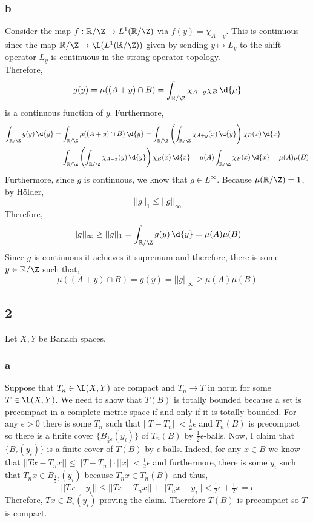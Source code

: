 \documentclass[12pt]{article}
\newcommand{\R}{\mathbb{R}}
\begin{document}
\subsubsection{b}

Consider the map $f : \R / \Z \to L^1(\R / \Z)$ via $f(y) = \chi_{A + y}$. This is continuous since the map $\R / \Z \to \L(L^1(\R / \Z))$ given by sending $y \mapsto L_y$ to the shift operator $L_y$ is continuous in the strong operator topology. 
\bigskip\\
Therefore,
\[ g(y) = \mu((A + y) \cap B) = \int_{\R / \Z} \chi_{A + y} \chi_B \, \d{\mu} \]
is a continuous function of $y$. Furthermore,
\begin{align*}
\int_{\R / \Z} g(y) \, \d{y} & = \int_{\R / \Z} \mu((A + y) \cap B) \, \d{y} = \int_{\R/\Z} \left( \int_{\R / \Z} \chi_{A + y}(x) \, \d{y} \right) \chi_B(x) \, \d{x}
\\
& = \int_{\R / \Z} \left( \int_{\R / \Z} \chi_{A - x}(y) \, \d{y} \right) \chi_B(x) \, \d{x} = \mu(A) \int_{\R/\Z} \chi_B(x) \, \d{x} = \mu(A) \mu(B)
\end{align*}
Furthermore, since $g$ is continuous, we know that $g \in L^\infty$. Because $\mu(\R / \Z) = 1$, by H\"{o}lder,
\[ || g ||_1 \le || g ||_{\infty} \]
Therefore,
\[ || g ||_{\infty} \ge || g ||_1 = \int_{\R / \Z} g(y) \, \d{y} = \mu(A) \mu(B) \]
Since $g$ is continuous it achieves it supremum and therefore, there is some $y \in \R / \Z$ such that,
\[ \mu((A + y) \cap B) = g(y) = || g ||_{\infty} \ge \mu(A) \mu(B) \]

\subsection{2}

Let $X, Y$ be Banach spaces.

\subsubsection{a}

Suppose that $T_n \in \L(X, Y)$ are compact and $T_n \to T$ in norm for some $T \in \L(X, Y)$. We need to show that $T(B)$ is totally bounded because a set is precompact in a complete metric space if and only if it is totally bounded. For any $\epsilon > 0$ there is some $T_n$ such that $|| T - T_n || < \frac{1}{2} \epsilon$ and $T_n(B)$ is precompact so there is a finite cover $\{ B_{\frac{1}{2} \epsilon}(y_i) \}$ of $T_n(B)$ by $\frac{1}{2} \epsilon$-balls. Now, I claim that $\{ B_\epsilon(y_i) \}$ is a finite cover of $T(B)$ by $\epsilon$-balls. Indeed, for any $x \in B$ we know that $|| Tx - T_n x|| \le || T - T_n || \cdot || x || < \frac{1}{2} \epsilon$ and furthermore, there is some $y_i$ such that $T_n x \in B_{\tfrac{1}{2} \epsilon}(y_i)$ because $T_n x \in T_n(B)$ and thus,
\[ || T x - y_i || \le || T x - T_n x || + || T_n x - y_i || < \tfrac{1}{2} \epsilon + \tfrac{1}{2} \epsilon = \epsilon \]
Therefore, $T x \in B_\epsilon(y_i)$ proving the claim. Therefore $T(B)$ is precompact so $T$ is compact.
\end{document}
